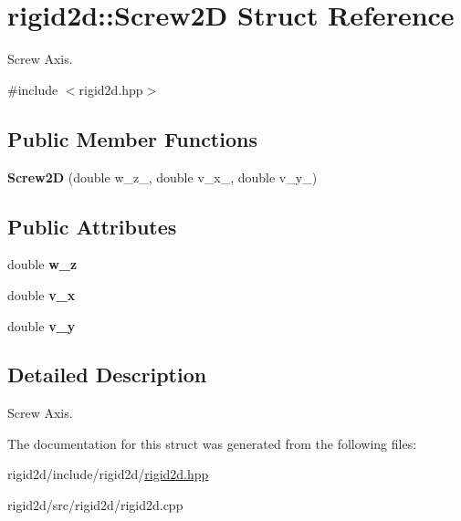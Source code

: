 \hypertarget{structrigid2d_1_1Screw2D}{}\section{rigid2d\+:\+:Screw2D Struct Reference}
\label{structrigid2d_1_1Screw2D}


Screw Axis.  




{\ttfamily \#include $<$rigid2d.\+hpp$>$}

\subsection*{Public Member Functions}
\begin{DoxyCompactItemize}
\item 
\mbox{\label{structrigid2d_1_1Screw2D_aafc846cdd1ce1482ac033720374a6581}} 
{\bfseries Screw2D} (double w\+\_\+z\+\_\+, double v\+\_\+x\+\_\+, double v\+\_\+y\+\_\+)
\end{DoxyCompactItemize}
\subsection*{Public Attributes}
\begin{DoxyCompactItemize}
\item 
\mbox{\label{structrigid2d_1_1Screw2D_a834830a5bd4a0e86b51505405c10e6d7}} 
double {\bfseries w\+\_\+z}
\item 
\mbox{\label{structrigid2d_1_1Screw2D_ac92d63f90c5cd05a8cbdbc8a30949596}} 
double {\bfseries v\+\_\+x}
\item 
\mbox{\label{structrigid2d_1_1Screw2D_a8869a41619ecc359ff934d24189e85c7}} 
double {\bfseries v\+\_\+y}
\end{DoxyCompactItemize}


\subsection{Detailed Description}
Screw Axis. 

The documentation for this struct was generated from the following files\+:\begin{DoxyCompactItemize}
\item 
rigid2d/include/rigid2d/\hyperlink{rigid2d_8hpp}{rigid2d.\+hpp}\item 
rigid2d/src/rigid2d/rigid2d.\+cpp\end{DoxyCompactItemize}
